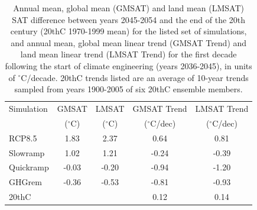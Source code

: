 \documentclass[grl]{AGUTeX}  %
\begin{document}
\begin{article}
\begin{table}
\centering
\begin{tabular}{ l  || c | c || c | c }
   Simulation        &  GMSAT     	&  LMSAT     	& GMSAT Trend	& LMSAT Trend \\
                             & ($^\circ$C) 	& ($^\circ$C) 	&  ($^\circ$C/dec) &   ($^\circ$C/dec) \\
  \hline    
 RCP8.5  		 & 1.83   	&  2.37   	&    0.64   		& 0.81	  \\
 Slowramp      	&  1.02  	&   1.21   	&    -0.24   	&  -0.39 \\
 Quickramp      	&  -0.03  	&   -0.20  	&    -0.94   	&  -1.20 \\
 GHGrem      	&  -0.36  	&   -0.53   	&    -0.81  		&  -0.93 \\
 \hline
 20thC 	     	&   	 	&  	   	&    0.12   		&  0.14 \\          
  \hline  
\end{tabular}
\caption{Annual mean, global mean (GMSAT) and land mean (LMSAT) SAT difference between years 2045-2054 and the end of the 20th century (20thC 1970-1999 mean) for the listed set of simulations, and annual mean, global mean linear trend (GMSAT Trend) and land mean linear trend (LMSAT Trend) for the first decade following the start of climate engineering (years 2036-2045), in units of $^\circ$C/decade. 20thC trends listed are an average of 10-year trends sampled from years 1900-2005 of six 20thC ensemble members.
\label{tbl:means}}
\end{table}


\end{article}
\end{document}
